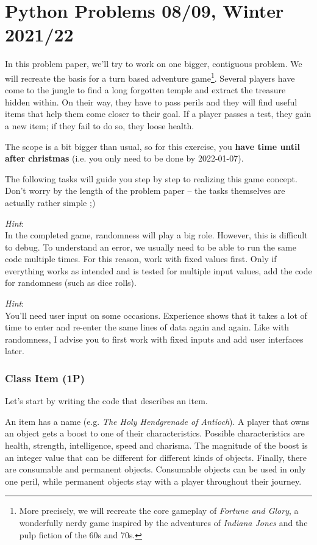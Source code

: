 \documentclass[
	english,
	fontsize=10pt,
	parskip=half,
	titlepage=true,
	DIV=12
]{scrartcl}
\newcommand*{\eg}{e.\;g. }
\begin{document}
\part*{Python Problems 08/09, Winter 2021/22}
In this problem paper, we'll try to work on one bigger, contiguous problem. We will recreate the basis for a turn based adventure game\footnote{More precisely, we will recreate the core gameplay of \emph{Fortune and Glory}, a wonderfully nerdy game inspired by the adventures of \emph{Indiana Jones} and the pulp fiction of the 60s and 70s.}. Several players have come to the jungle to find a long forgotten temple and extract the treasure hidden within. On their way, they have to pass perils and they will find useful items that help them come closer to their goal. If a player passes a test, they gain a new item; if they fail to do so, they loose health.

The scope is a bit bigger than usual, so for this exercise, you \textbf{have time until after christmas} (i.e. you only need to be done by 2022-01-07). 

The following tasks will guide you step by step to realizing this game concept. Don't worry by the length of the problem paper -- the tasks themselves are actually rather simple ;)

\emph{Hint}:\\
In the completed game, randomness will play a big role. However, this is difficult to debug. To understand an error, we usually need to be able to run the same code multiple times. For this reason, work with fixed values first. Only if everything works as intended and is tested for multiple input values, add the code for randomness (such as dice rolls).

\emph{Hint}:\\
You'll need user input on some occasions. Experience shows that it takes a lot of time to enter and re-enter the same lines of data again and again. Like with randomness, I advise you to first work with fixed inputs and add user interfaces later.


\section{Class Item (1\;P)}
Let's start by writing the code that describes an item.

An item has a name (\eg \emph{The Holy Hendgrenade of Antioch}). A player that owns an object gets a boost to one of their characteristics. Possible characteristics are health, strength, intelligence, speed and charisma. The magnitude of the boost is an integer value that can be different for different kinds of objects. Finally, there are consumable and permanent objects. Consumable objects can be used in only one peril, while permanent objects stay with a player throughout their journey.
\end{document}
